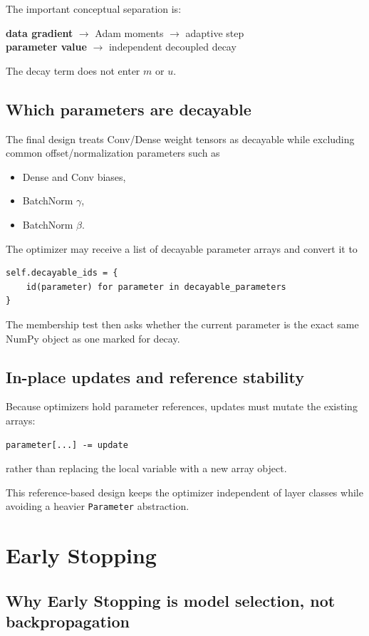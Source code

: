 \documentclass[11pt,a4paper]{article}
\newcommand{\code}[1]{\texttt{#1}}
\begin{document}
The important conceptual separation is:
\begin{center}
\textbf{data gradient} $\rightarrow$ Adam moments $\rightarrow$ adaptive step\\
\textbf{parameter value} $\rightarrow$ independent decoupled decay
\end{center}
The decay term does not enter $m$ or $u$.

\subsection{Which parameters are decayable}

The final design treats Conv/Dense weight tensors as decayable while excluding common offset/normalization parameters such as
\begin{itemize}
    \item Dense and Conv biases,
    \item BatchNorm $\gamma$,
    \item BatchNorm $\beta$.
\end{itemize}

The optimizer may receive a list of decayable parameter arrays and convert it to
\begin{lstlisting}
self.decayable_ids = {
    id(parameter) for parameter in decayable_parameters
}
\end{lstlisting}
The membership test then asks whether the current parameter is the exact same NumPy object as one marked for decay.

\subsection{In-place updates and reference stability}

Because optimizers hold parameter references, updates must mutate the existing arrays:
\begin{lstlisting}
parameter[...] -= update
\end{lstlisting}
rather than replacing the local variable with a new array object.

This reference-based design keeps the optimizer independent of layer classes while avoiding a heavier \code{Parameter} abstraction.

\section{Early Stopping}

\subsection{Why Early Stopping is model selection, not backpropagation}
\end{document}
